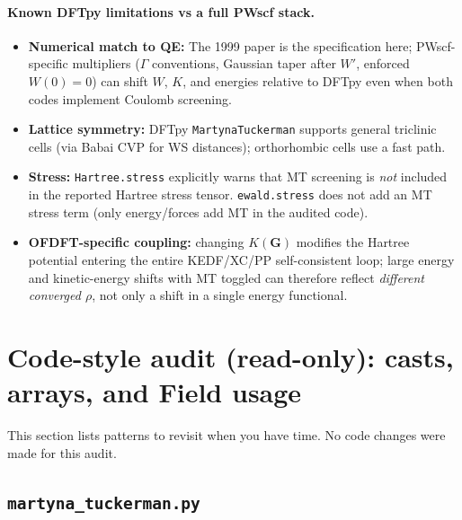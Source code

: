 \documentclass[11pt,a4paper]{article}
\begin{document}
\paragraph{Known DFTpy limitations vs a full PWscf stack.}
\begin{itemize}
  \item \textbf{Numerical match to QE:} The 1999 paper is the specification here; PWscf-specific
        multipliers ($\Gamma$ conventions, Gaussian taper after $W'$, enforced $W(0)=0$) can shift
        $W$, $K$, and energies relative to DFTpy even when both codes implement Coulomb screening.
  \item \textbf{Lattice symmetry:} DFTpy \texttt{MartynaTuckerman} supports general
        triclinic cells (via Babai CVP for WS distances); orthorhombic cells use a fast path.
  \item \textbf{Stress:} \texttt{Hartree.stress} explicitly warns that MT screening is
        \emph{not} included in the reported Hartree stress tensor. \texttt{ewald.stress}
        does not add an MT stress term (only energy/forces add MT in the audited code).
  \item \textbf{OFDFT-specific coupling:} changing $K(\mathbf G)$ modifies the Hartree
        potential entering the entire KEDF/XC/PP self-consistent loop; large energy and
        kinetic-energy shifts with MT toggled can therefore reflect \emph{different
        converged $\rho$}, not only a shift in a single energy functional.
\end{itemize}

\section{Code-style audit (read-only): casts, arrays, and Field usage}

This section lists patterns to revisit when you have time. No code changes were made
for this audit.

\subsection{\texttt{martyna\_tuckerman.py}}
\end{document}
